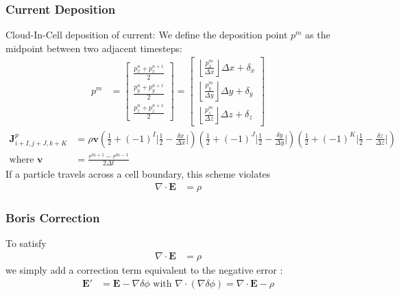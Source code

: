 \documentclass[5pt]{beamer}
\begin{document}
  \begin{frame}
  \frametitle{Current Deposition}
  Cloud-In-Cell deposition of current: 
  We define the deposition point $p^m$ as the midpoint between two adjacent timesteps:
  {\scriptsize
  \begin{align}
  p^m &= \begin{bmatrix} \frac{p_x^n + p_x^{n+1}}{2} \\ \frac{p_y^n + p_y^{n+1}}{2} \\ \frac{p_z^n + p_z^{n+1}}{2} \end{bmatrix} = 
  \begin{bmatrix} 
  \left \lfloor{\frac{p^m_x}{\Delta x}}\right \rfloor \Delta x + \delta_x \\ 
  \left \lfloor{\frac{p^m_y}{\Delta y}}\right \rfloor \Delta y + \delta_y \\ 
  \left \lfloor{\frac{p^m_z}{\Delta z}}\right \rfloor \Delta z + \delta_z \end{bmatrix}
  \end{align}
  }%
  {\scriptsize
  \begin{align}
  \mathbf{J}^p_{i+I,j+J,k+K} &= \rho\mathbf{v}\left(\frac{1}{2} + (-1)^I \bigg\rvert \frac{1}{2} - \frac{\delta x}{\Delta x} \bigg\rvert \right)
                                    \left(\frac{1}{2} + (-1)^J \bigg\rvert \frac{1}{2} - \frac{\delta y}{\Delta y} \bigg\rvert \right)
                                    \left(\frac{1}{2} + (-1)^K \bigg\rvert \frac{1}{2} - \frac{\delta z}{\Delta z} \bigg\rvert \right) \\
                                    \text{where } \mathbf{v} &= \frac{r^{m + 1} - r^{m - 1}}{2 \Delta t}
  \end{align}
  }%
  \pause
  If a particle travels across a cell boundary, this scheme violates
  {\scriptsize
  \begin{align}
  \nabla \cdot \mathbf{E} &= \rho
  \end{align}
  }%
  \end{frame}
  \begin{frame}
  \frametitle{Boris Correction}
  To satisfy
  \begin{align*}
  \nabla \cdot \mathbf{E} &= \rho
  \end{align*}
  we simply add a correction term equivalent to the negative error \cite{Lund2016}:
  \begin{align}
  \mathbf{E'} &= \mathbf{E} - \nabla\delta\phi \text{ with } \nabla \cdot \left(\nabla\delta\phi\right) = \nabla \cdot \mathbf{E} - \rho
  \end{align}
  \end{frame}
\end{document}

